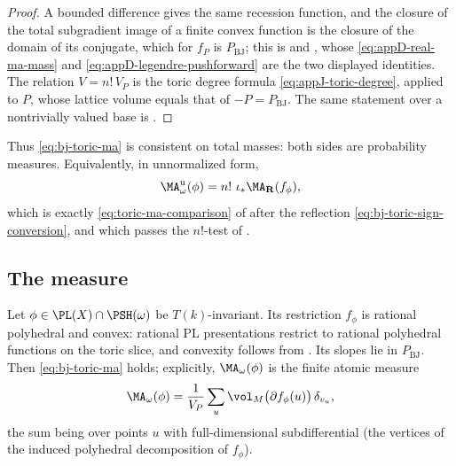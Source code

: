 \begin{proof}
A bounded difference gives the same recession function, and the closure of
the total subgradient image of a finite convex function is the closure of
the domain of its conjugate, which for $f_P$ is $P_{\mathrm{BJ}}$; this
is  and
, whose \eqref{eq:appD-real-ma-mass}
and \eqref{eq:appD-legendre-pushforward} are the two displayed identities.
The relation $V=n!\,V_P$ is the toric degree formula
\eqref{eq:appJ-toric-degree}, applied to $P$, whose lattice volume equals
that of $-P=P_{\mathrm{BJ}}$.  The same statement over a nontrivially
valued base is .
\end{proof}

Thus \eqref{eq:bj-toric-ma} is consistent on total masses: both sides are
probability measures.  Equivalently, in unnormalized form,
\[
 \MA^{\mathrm u}_\omega(\phi)=n!\ \iota_*\MA_{\mathbf R}(f_\phi),
\]
which is exactly \eqref{eq:toric-ma-comparison} of
 after the reflection
\eqref{eq:bj-toric-sign-conversion}, and which passes the $n!$-test of
.

\subsection{The measure}
\label{sec:ch49-toric-measure}

\begin{proposition}
\label{prop:ch49-toric-ma-pl}
Let $\phi\in\PL(X)\cap\PSH(\omega)$ be $T(k)$-invariant.
Its restriction $f_\phi$ is rational polyhedral and convex:
rational PL presentations restrict to rational polyhedral functions
on the toric slice, and convexity follows from
.  Its slopes lie in $P_{\mathrm{BJ}}$.  Then
\eqref{eq:bj-toric-ma} holds; explicitly, $\MA_\omega(\phi)$ is the
finite atomic measure
\[
 \MA_\omega(\phi)
 =\frac1{V_P}\sum_{u}\vol_M\bigl(\partial f_\phi(u)\bigr)\,\delta_{v_u},
\]
the sum being over points $u$ with full-dimensional subdifferential
(the vertices of the induced polyhedral decomposition of
$f_\phi$).
\end{proposition}

